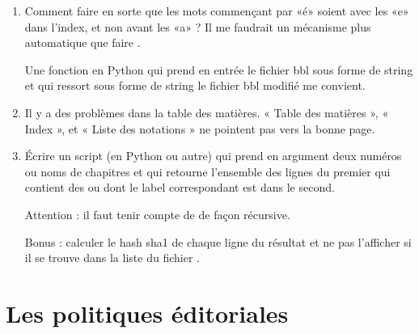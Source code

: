 \begin{enumerate}
	\item
	      Comment faire en sorte que les mots commençant par «é» soient avec les «e» dans l'index, et non avant les «a» ? Il me faudrait un mécanisme plus automatique que faire .

	      Une fonction en Python qui prend en entrée le fichier bbl sous forme de string et qui ressort sous forme de string le fichier bbl modifié me convient.
	\item
	      Il y a des problèmes dans la table des matières.  « Table des matières », « Index », et « Liste des notations » ne pointent pas vers la bonne page.


	\item
	      Écrire un script (en Python ou autre) qui prend en argument deux numéros ou noms de chapitres et qui retourne l'ensemble des lignes du premier qui contient des  ou  dont le label correspondant est dans le second.

	      Attention : il faut tenir compte de  de façon récursive.

	      Bonus : calculer le hash sha1 de chaque ligne du résultat et ne pas l'afficher si il se trouve dans la liste du fichier .
\end{enumerate}

\section{Les politiques éditoriales}
\label{SECooINTROpolitics}

